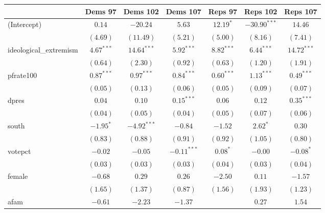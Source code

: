 \documentclass[12pt]{article}
\begin{document}
\begin{table}
	\begin{center}
		\begin{tabular}{l c c c c c c }
			\hline
			& Dems 97 & Dems 102 & Dems 107 & Reps 97 & Reps 102 & Reps 107 \\
			\hline
			(Intercept)            & $0.14$       & $-20.24$      & $5.63$        & $12.19^{*}$  & $-30.90^{***}$ & $14.46$       \\
			& $(4.69)$     & $(11.49)$     & $(5.21)$      & $(5.00)$     & $(8.16)$       & $(7.41)$      \\
			ideological\_extremism & $4.67^{***}$ & $14.64^{***}$ & $5.92^{***}$  & $8.82^{***}$ & $6.44^{***}$   & $14.72^{***}$ \\
			& $(0.64)$     & $(2.30)$      & $(0.92)$      & $(0.63)$     & $(1.20)$       & $(1.91)$      \\
			pfrate100              & $0.87^{***}$ & $0.97^{***}$  & $0.84^{***}$  & $0.60^{***}$ & $1.13^{***}$   & $0.49^{***}$  \\
			& $(0.05)$     & $(0.13)$      & $(0.06)$      & $(0.05)$     & $(0.09)$       & $(0.07)$      \\
			dpres                  & $0.04$       & $0.10$        & $0.15^{***}$  & $0.06$       & $0.12$         & $0.35^{***}$  \\
			& $(0.04)$     & $(0.05)$      & $(0.04)$      & $(0.05)$     & $(0.07)$       & $(0.06)$      \\
			south                  & $-1.95^{*}$  & $-4.92^{***}$ & $-0.84$       & $-1.52$      & $2.62^{*}$     & $0.30$        \\
			& $(0.83)$     & $(0.88)$      & $(0.91)$      & $(0.92)$     & $(1.05)$       & $(0.80)$      \\
			votepct                & $-0.02$      & $-0.05$       & $-0.11^{***}$ & $0.08^{*}$   & $-0.00$        & $-0.08^{*}$   \\
			& $(0.03)$     & $(0.03)$      & $(0.03)$      & $(0.04)$     & $(0.03)$       & $(0.04)$      \\
			female                 & $-0.68$      & $0.29$        & $0.26$        & $-2.50$      & $0.11$         & $-1.57$       \\
			& $(1.65)$     & $(1.37)$      & $(0.87)$      & $(1.56)$     & $(1.93)$       & $(1.23)$      \\
			afam                   & $-0.61$      & $-2.23$       & $-1.37$       &              & $0.27$         & $1.54$        \\

\end{tabular}
\end{center}
\end{table}
\end{document}
